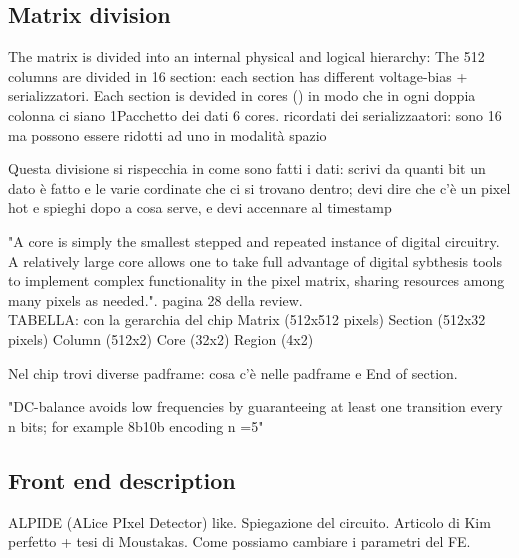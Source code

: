 \subsection{Matrix division}
The matrix is divided into an internal physical and logical hierarchy:
The 512 columns are divided in 16 section: each section has different voltage-bias + serializzatori.
Each section is devided in cores () in modo che in ogni doppia colonna ci siano 1Pacchetto dei dati
6 cores. ricordati dei serializzaatori: sono 16 ma possono essere ridotti ad uno in modalità spazio

Questa divisione si rispecchia in come sono fatti i dati: scrivi da quanti bit un
dato è fatto e le varie cordinate che ci si trovano dentro; devi dire che c'è un pixel hot
e spieghi dopo a cosa serve, e devi accennare al timestamp

"A core is simply the smallest stepped and repeated instance of digital circuitry.
A relatively large core allows one to take full advantage of digital sybthesis tools
to implement complex functionality in the pixel matrix, sharing resources among
many pixels as needed.".
pagina 28 della review.\\




TABELLA: con la gerarchia del chip
Matrix (512x512 pixels)
Section (512x32 pixels)
Column (512x2)
Core (32x2)
Region (4x2)

Nel chip trovi diverse padframe: cosa c'è nelle padframe e End of section.

"DC-balance avoids low frequencies by guaranteeing at least one transition every
n bits; for example 8b10b encoding n =5"


\subsection{Front end description}
ALPIDE (ALice PIxel Detector) like.
Spiegazione del circuito. Articolo di Kim perfetto + tesi di Moustakas.
Come possiamo cambiare i parametri del FE.
